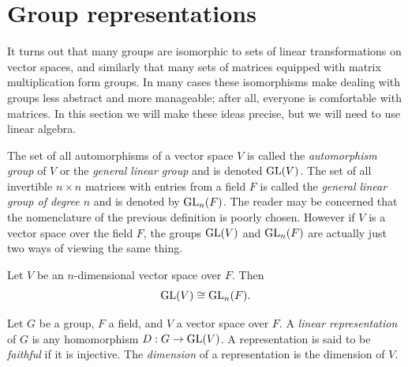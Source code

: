 \section{Group representations}\label{sec:represent}


It turns out that many groups are isomorphic to sets of linear transformations
on vector spaces, and similarly that many sets of matrices equipped with matrix
multiplication form groups. In many cases these isomorphisms make dealing with
groups less abstract and more manageable; after all, everyone is comfortable
with matrices. In this section we will make these ideas precise, but we will
need to use linear algebra. 

The set of all automorphisms of a vector space $V$ is called
the {\it automorphism group} of $V$ or the 
{\it general linear group} and is
denoted $\operatorname{GL}(V)$. The set of all invertible $n\times n$ matrices with entries from
a field $F$ is called the {\it general linear group of degree $n$} and
is denoted by $\operatorname{GL}_{n}(F)$.
The reader may be concerned that the nomenclature
of the previous definition is poorly chosen. However if $V$ is a vector space
over the field $F$, the groups $\operatorname{GL}(V)$ and $\operatorname{GL}_{n}(F)$ are actually just two
ways of viewing the same thing. 

\begin{theorem}{}{}
  Let $V$ be an $n$-dimensional vector space over $F$. Then 
  $$\operatorname{GL}(V)\cong \operatorname{GL}_{n}(F).$$
\end{theorem}

Let $G$ be a group, $F$ a field, and $V$ a vector space over
$F$. A {\it linear representation} of $G$ 
is any homomorphism $D:G\to \operatorname{GL}(V)$. A representation is said to be 
{\it faithful} if it is injective. 
The {\it dimension} of a representation 
is the dimension of $V$.

